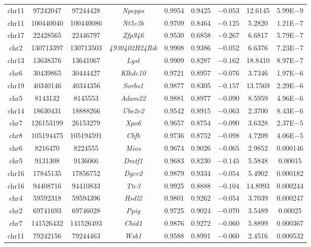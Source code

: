 \begin{appendices}
\begin{table}[!htbp]
\begin{tabular}{@{\extracolsep{5pt}} ccccccccc}
	chr11 & 97242047 & 97244428 & \textit{Npepps} & 0.9954 & 0.9425 & $-0.053$ & 12.6145 & 5.99E$-9$\\ 
	chr11 & 100440040 & 100440086 & \textit{Nt5c3b} & 0.9709 & 0.8464 & $-0.125$ & 5.2820 & 1.21E$-7$\\ 
	chr17 & 22428565 & 22446797 & \textit{Zfp946} & 0.9530 & 0.6858 & $-0.267$ & 6.6817 & 5.79E$-7$ \\ 
	chr2 & 130713397  & 130713503& \textit{4930402H24Rik} & 0.9908 & 0.9386 & $-0.052$ & 6.6376 & 7.23E$-7$ \\ 
	chr13 & 13638376 & 13641067 & \textit{Lyst} & 0.9909 & 0.8287 & $-0.162$ & 18.8410 & 8.97E$-7$\\ 
	chr6 & 30439865 & 30444427 & \textit{Klhdc10} & 0.9721 & 0.8957 & $-0.076$ & 3.7346 & 1.97E$-6$\\ 
	chr19 & 40340146 & 40344356 & \textit{Sorbs1} & 0.9877 & 0.8305 & $-0.157$ & 13.7569 & 2.29E$-6$\\ 
	chr5 & 8143132 & 8145553 & \textit{Adam22} & 0.9881 & 0.8977 & $-0.090$ & 8.5959 & 4.96E$-6$ \\ 
	chr14 & 18630431 & 18888266 & \textit{Ube2e2} & 0.9542 & 0.8915 & $-0.063$ & 2.3700 & 8.43E$-6$\\ 
	chr7 & 126153199 & 26153279 & \textit{Xpo6} & 0.9657 & 0.8754 & $-0.090$ & 3.6328 & 2.37E$-5$ \\ 
	chr8 &  105194475 & 105194591 & \textit{Cbfb} & 0.9736 & 0.8752 & $-0.098$ & 4.7209 & 4.06E$-5$ \\ 
	chr6 & 8216470 & 8224555 & \textit{Mios} & 0.9674 & 0.9026 & $-0.065$ & 2.9852 & 0.000146 \\ 
	chr5 & 9131308 & 9136066 & \textit{Dmtf1} & 0.9683 & 0.8230 & $-0.145$ & 5.5848 & 0.00015 \\ 
	chr16 & 17845135 & 17856752 & \textit{Dgcr2} & 0.9879 & 0.9334 & $-0.054$ & 5.4902 & 0.000182 \\ 
	chr16 & 94408716 & 94410833 & \textit{Ttc3} & 0.9925 & 0.8888 & $-0.104$ & 14.8993 & 0.000244 \\ 
	chr4 & 59592318 & 59594396 & \textit{Hsdl2} & 0.9801 & 0.9262 & $-0.054$ & 3.7039 & 0.000247 \\ 
	chr2 & 69741693 & 69746028 & \textit{Ppig} & 0.9725 & 0.9024 & $-0.070$ & 3.5489 & 0.00025 \\ 
	chr7 & 141526432  & 141526493 & \textit{Chid1} & 0.9876 & 0.9272 & $-0.060$ & 5.8899 & 0.000367 \\ 
	chr11 & 79242156 & 79244463 & \textit{Wsb1} & 0.9588 & 0.8991 & $-0.060$ & 2.4516 & 0.000532 \\ 

\end{tabular}
\end{table}
\end{appendices}
